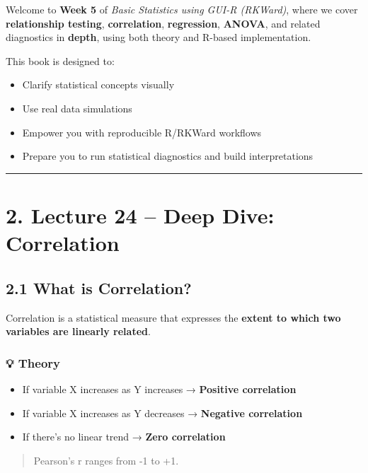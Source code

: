 \documentclass[
  letterpaper,
  DIV=11,
  numbers=noendperiod]{scrreprt}
\providecommand{\tightlist}{%
  \setlength{\itemsep}{0pt}\setlength{\parskip}{0pt}}
\begin{document}
Welcome to \textbf{Week 5} of \emph{Basic Statistics using GUI-R
(RKWard)}, where we cover \textbf{relationship testing},
\textbf{correlation}, \textbf{regression}, \textbf{ANOVA}, and related
diagnostics in \textbf{depth}, using both theory and R-based
implementation.

This book is designed to:

\begin{itemize}
\tightlist
\item
  Clarify statistical concepts visually
\item
  Use real data simulations
\item
  Empower you with reproducible R/RKWard workflows
\item
  Prepare you to run statistical diagnostics and build interpretations
\end{itemize}

\begin{center}\rule{0.5\linewidth}{0.5pt}\end{center}

\section{2. Lecture 24 -- Deep Dive:
Correlation}\label{lecture-24-deep-dive-correlation}

\subsection{2.1 What is Correlation?}\label{what-is-correlation}

Correlation is a statistical measure that expresses the \textbf{extent
to which two variables are linearly related}.

\subsubsection{💡 Theory}\label{theory}

\begin{itemize}
\tightlist
\item
  If variable X increases as Y increases → \textbf{Positive correlation}
\item
  If variable X increases as Y decreases → \textbf{Negative correlation}
\item
  If there's no linear trend → \textbf{Zero correlation}
\end{itemize}

\begin{quote}
Pearson's r ranges from -1 to +1.
\end{quote}
\end{document}
